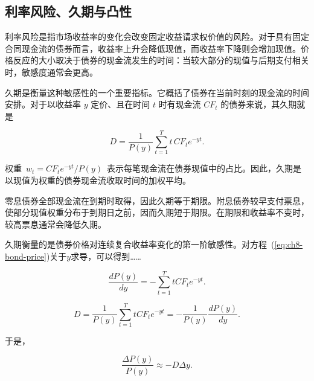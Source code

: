 \subsection{利率风险、久期与凸性}

利率风险是指市场收益率的变化会改变固定收益请求权价值的风险。对于具有固定合同现金流的债券而言，收益率上升会降低现值，而收益率下降则会增加现值。价格反应的大小取决于债券的现金流发生的时间：当较大部分的现值与后期支付相关时，敏感度通常会更高。

久期是衡量这种敏感性的一个重要指标。它概括了债券在当前时刻的现金流的时间安排。对于以收益率 $y$ 定价、且在时间 $t$ 时有现金流 $CF_t$ 的债券来说，其久期就是

\begin{equation}
D=\frac{1}{P(y)}
\sum_{t=1}^{T}
t\,CF_t e^{-yt}.
\label{eq:ch8-macaulay-duration}
\end{equation}

权重~$w_t = CF_t e^{-yt}/P(y)$~表示每笔现金流在债券现值中的占比。因此，久期是以现值为权重的债券现金流收取时间的加权平均。

零息债券全部现金流在到期时取得，因此久期等于期限。附息债券较早支付票息，使部分现值权重分布于到期日之前，因而久期短于期限。在期限和收益率不变时，较高票息通常会降低久期。

久期衡量的是债券价格对连续复合收益率变化的第一阶敏感性。对方程~(\ref{eq:ch8-bond-price})关于$y$求导，可以得到……

\begin{equation}
\frac{dP(y)}{dy}=-\sum_{t=1}^{T}
tCF_t e^{-yt}.
\label{eq:ch8-price-yield-derivative}
\end{equation}

\begin{equation}
D=
\frac{1}{P(y)}
\sum_{t=1}^{T}
tCF_t e^{-yt}
=
-\frac{1}{P(y)}
\frac{dP(y)}{dy}
.
\label{eq:ch8-duration}
\end{equation}

于是， 

\begin{equation}
\frac{\Delta P(y)}{P(y)}
\approx
-D \Delta y.
\label{eq:ch8-duration-price-change}
\end{equation}

